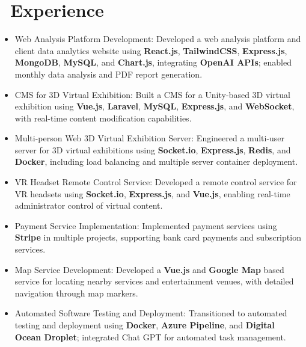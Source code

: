 \documentclass{resume}
\begin{document}
\section{\faUsers\ Experience}
\begin{itemize}[noitemsep]
  \item Web Analysis Platform Development: Developed a web analysis platform and client data analytics website using \textbf{React.js}, \textbf{TailwindCSS}, \textbf{Express.js}, \textbf{MongoDB}, \textbf{MySQL}, and \textbf{Chart.js}, integrating \textbf{OpenAI APIs}; enabled monthly data analysis and PDF report generation.
  \item CMS for 3D Virtual Exhibition: Built a CMS for a Unity-based 3D virtual exhibition using \textbf{Vue.js}, \textbf{Laravel}, \textbf{MySQL}, \textbf{Express.js}, and \textbf{WebSocket}, with real-time content modification capabilities.
  \item Multi-person Web 3D Virtual Exhibition Server: Engineered a multi-user server for 3D virtual exhibitions using \textbf{Socket.io}, \textbf{Express.js}, \textbf{Redis}, and \textbf{Docker}, including load balancing and multiple server container deployment.
  \item VR Headset Remote Control Service: Developed a remote control service for VR headsets using \textbf{Socket.io}, \textbf{Express.js}, and \textbf{Vue.js}, enabling real-time administrator control of virtual content.
  \item Payment Service Implementation: Implemented payment services using \textbf{Stripe} in multiple projects, supporting bank card payments and subscription services.
  \item Map Service Development: Developed a \textbf{Vue.js} and \textbf{Google Map} based service for locating nearby services and entertainment venues, with detailed navigation through map markers.
  \item Automated Software Testing and Deployment: Transitioned to automated testing and deployment using \textbf{Docker}, \textbf{Azure Pipeline}, and \textbf{Digital Ocean Droplet}; integrated Chat GPT for automated task management.
\end{itemize}
\end{document}
